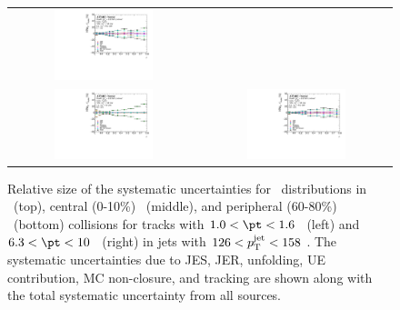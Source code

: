 \begin{figure}
{\begin{tabular}{cc}
\includegraphics[width=0.55\textwidth]{figures/systematics/ChPS_dR_sys_PbPb_error_trk6_jet7_cent0} \\
\includegraphics[width=0.55\textwidth]{figures/systematics/ChPS_dR_sys_PbPb_error_trk2_jet7_cent5} &
\includegraphics[width=0.55\textwidth]{figures/systematics/ChPS_dR_sys_PbPb_error_trk6_jet7_cent5} \\
\end{tabular}}
\caption{
Relative size of the systematic uncertainties for \Dptr\ distributions in \pp\ (top), central (0-10\%) \pbpb\ (middle), and peripheral (60-80\%) \pbpb\ (bottom) collisions for tracks with $1.0 < \pt < 1.6$ \GeV\ (left) and $6.3 < \pt < 10$ \GeV\ (right) in jets with $126 < \mbox{$p_{\mathrm{T}}^{\mathrm{jet}}$} < 158$ \GeV. The systematic uncertainties due to JES, JER, unfolding, UE contribution, MC non-closure, and tracking are shown along with the total systematic uncertainty from all sources.
}
\label{fig:Systematics_Dpt}
\end{figure}

